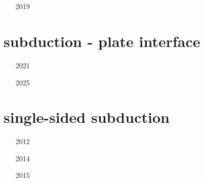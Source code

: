 \begin{small}
\begin{itemize}
\item[\twothousandthree] 
\item[\twothousandsix] 
\item[\twothousandnine] 
\item[\twothousandnine] 
\item[\twothousandtwelve] 
\item[\twothousandthirteen] 
 \\
\item[\twothousandfourteen]
 \\
\item[\twothousandfifteen]
\item[2019]
\item[\twothousandtwenty]
\end{itemize}
\end{small}





\section{subduction - plate interface} 

\begin{small}
\begin{itemize}
\item[2021]
\item[2025]
 \\
\end{itemize}
\end{small}

\section{single-sided subduction}

\begin{small}
\begin{itemize}
\item[2012]
\item[2014]
\item[2015]
\end{itemize}
\end{small}

